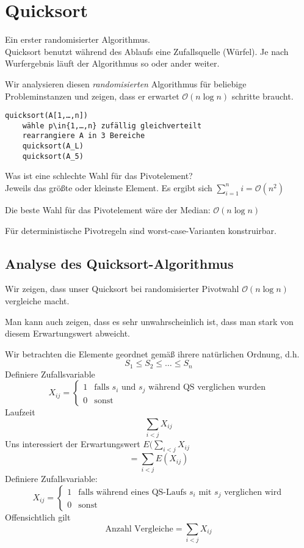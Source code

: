 \documentclass{mycourse}
\begin{document}
\section{Quicksort}
Ein erster randomisierter Algorithmus.\\
Quicksort benutzt während des Ablaufs eine Zufallsquelle (Würfel).
Je nach Wurfergebnis läuft der Algorithmus so oder ander weiter.

Wir analysieren diesen \emph{randomisierten} Algorithmus für beliebige Probleminstanzen und zeigen, dass er erwartet $\mathcal O(n\log n)$ schritte braucht.
\begin{verbatim}
quicksort(A[1,…,n])
	wähle p\in{1,…,n} zufällig gleichverteilt
	rearrangiere A in 3 Bereiche
	quicksort(A_L)
	quicksort(A_5)
\end{verbatim}
Was ist eine schlechte Wahl für das Pivotelement?\\
Jeweils das größte oder kleinste Element. Es ergibt sich $\sum_{i=1}^ni=\mathcal O(n^2)$

Die beste Wahl für das Pivotelement wäre der Median: $\mathcal O(n\log n)$

\begin{note}
Für deterministische Pivotregeln sind worst-case-Varianten konstruirbar.
\end{note}

\subsection{Analyse des Quicksort-Algorithmus}

Wir zeigen, dass unser Quicksort bei randomisierter Pivotwahl $\mathcal O(n\log n)$ vergleiche macht.
\begin{note}
Man kann auch zeigen, dass es sehr unwahrscheinlich ist, dass man stark von diesem Erwartungswert abweicht.
\end{note}
Wir betrachten die Elemente geordnet gemäß ihrere natürlichen Ordnung, d.h.
\[
S_1\le S_2\le …\le S_n
\]
Definiere Zufallsvariable
\[
X_{ij}=\begin{cases}1 &\text{falls $s_i$ und $s_j$ während QS verglichen wurden}\\
0&\text{sonst}\end{cases}
\]
Laufzeit
\[
\sum_{i<j}X_{ij}
\]
Uns interessiert der Erwartungswert $E(\sum_{i<j}X_{ij}$
\[
=\sum_{i<j}E(X_{ij})
\]
Definiere Zufallsvariable:
\[
X_{ij} = \begin{cases}
1 & \text{falls während eines QS-Laufs $s_i$ mit $s_j$ verglichen wird}\\
0 & \text{sonst}
\end{cases}
\]
Offensichtlich gilt
\[
\text{Anzahl Vergleiche} = \sum_{i<j}X_{ij}
\]
\end{document}
